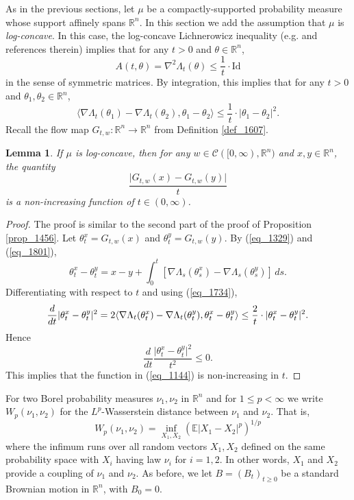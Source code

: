 \documentclass[12pt,a4paper]{article}
\newcommand{\EE}{\mathbb{E}}
\newcommand{\RR}{\mathbb{R}}
\newcommand{\R}{\mathbb{R}}
\newcommand{\id}{\mathrm{Id}}
\newtheorem{lemma}[theorem]{Lemma}
\theoremstyle{definition}
\begin{document}
As in the previous sections, let $\mu$ be a compactly-supported probability measure whose support affinely spans $\RR^n$.
In this section we add the assumption that $\mu$ is {\it log-concave}. In this case, the log-concave Lichnerowicz inequality (e.g. \cite[Section 4]{KLbull} and references therein)
implies that for any $t > 0$ and $\theta \in \RR^n$,
\begin{equation}  A(t, \theta) = \nabla^2 \Lambda_t(\theta) \leq \frac{1}{t} \cdot \id \label{eq_1817} \end{equation}
in the sense of symmetric matrices. By integration, this implies that for any $t > 0$ and $\theta_1, \theta_2 \in \RR^n$,
\begin{equation}  \langle \nabla \Lambda_t(\theta_1) - \nabla \Lambda_t(\theta_2), \theta_1 - \theta_2 \rangle \leq \frac{1}{t} \cdot |\theta_1 - \theta_2|^2.
\label{eq_1734} \end{equation}
%
Recall the flow map $G_{t,w}: \RR^n \rightarrow \RR^n$ from Definition \ref{def_1607}.
%
\begin{lemma} \label{lem_1119}
If $\mu$ is log-concave, then for any $w\in\mathcal C ([0,\infty) , \R^n)$
and $x,y \in \R^n$, the quantity
\begin{equation} 
\frac{ \vert G_{t,w} (x) - G_{t,w} (y) \vert }{t}
\label{eq_1144} \end{equation}
is a non-increasing function of $t \in (0, \infty)$.
\end{lemma}

\begin{proof}
The proof is  similar to the second part of the proof of
Proposition \ref{prop_1456}.
Let $\theta_t^{x} = G_{t,w} (x)$ and $\theta_t^{y} = G_{t,w} (y)$.
By (\ref{eq_1329}) and (\ref{eq_1801}), 
\[
\theta_t^x - \theta_t^y = x-y
+ \int_0^t \left[ \nabla \Lambda_s( \theta_s^x )
- \nabla \Lambda_s ( \theta_s^y ) \right] \, ds .
\]
Differentiating with respect to $t$ and using (\ref{eq_1734}),
\[
 \frac{d}{dt} \vert \theta_t^x - \theta_t^y \vert^2
= 2 \langle \nabla \Lambda_t(\theta_t^x)
- \nabla \Lambda_t( \theta_{t}^y ) , \theta_t^x - \theta_t^y \rangle \\
 \leq \frac{2}{t} \cdot \vert \theta_t^x - \theta_t^y \vert^2 .
 \]
Hence
\[
\frac d{dt} \frac{ \vert \theta_t^x - \theta_t^y \vert^2 }{ t^2 } \leq 0.
\]
This implies that the function in (\ref{eq_1144}) is non-increasing in $t$. 
\end{proof}

For two Borel probability measures $\nu_1, \nu_2$ in $\RR^n$ and for $1 \leq p < \infty$ we write $W_p(\nu_1, \nu_2)$ for the $L^p$-Wasserstein distance between $\nu_1$ and $\nu_2$. That is,
$$ W_p(\nu_1, \nu_2) = \inf_{X_1,X_2} \left( \EE |X_1 - X_2|^p \right)^{1/p} $$
where the infimum runs over all random vectors $X_1,X_2$ defined on the same probability space with $X_i$ having law $\nu_i$ for $i=1,2$. In other words, $X_1$ and $X_2$ provide a  coupling of $\nu_1$ and $\nu_2$. As before, we let $B = (B_t)_{t\geq 0}$
be a standard Brownian motion in $\RR^n$, with $B_0 = 0$.
\end{document}
